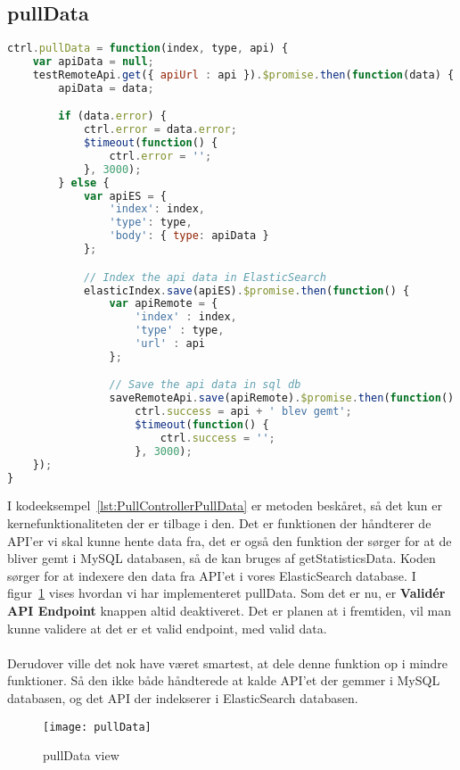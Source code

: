 \subsection{pullData}
\begin{lstlisting}[caption={pullData}, language={JavaScript}, label={lst:PullControllerPullData}]
ctrl.pullData = function(index, type, api) {
    var apiData = null;
    testRemoteApi.get({ apiUrl : api }).$promise.then(function(data) {
        apiData = data;

        if (data.error) {
            ctrl.error = data.error;
            $timeout(function() {
                ctrl.error = '';
            }, 3000);
        } else {
            var apiES = {
                'index': index,
                'type': type,
                'body': { type: apiData }
            };

            // Index the api data in ElasticSearch
            elasticIndex.save(apiES).$promise.then(function() {
                var apiRemote = {
                    'index' : index,
                    'type' : type,
                    'url' : api
                };

                // Save the api data in sql db
                saveRemoteApi.save(apiRemote).$promise.then(function() {
                    ctrl.success = api + ' blev gemt';
                    $timeout(function() {
                        ctrl.success = '';
                    }, 3000);
    });
}
\end{lstlisting}
I kodeeksempel~\ref{lst:PullControllerPullData} er metoden beskåret, så det kun er kernefunktionaliteten der er tilbage i den.
Det er funktionen der håndterer de API'er vi skal kunne hente data fra, det er også den funktion der sørger for at de bliver gemt 
i MySQL databasen, så de kan bruges af getStatisticsData. Koden sørger for at indexere den data fra API'et i vores ElasticSearch
database.
I figur~\ref{fig:pullData} vises hvordan vi har implementeret pullData. Som det er nu, er \textbf{Validér API Endpoint} knappen altid deaktiveret. 
Det er planen at i fremtiden, vil man kunne validere at det er et valid endpoint, med valid data.
\\\\
Derudover ville det nok have været smartest, at dele denne funktion op i mindre funktioner. Så den ikke både håndterede at kalde API'et der gemmer i MySQL databasen,
og det API der indekserer i ElasticSearch databasen.
\begin{figure}[H]
     \centering
     \texttt{[image: pullData]}
     \caption{pullData view}
     \label{fig:pullData}
\end{figure}
